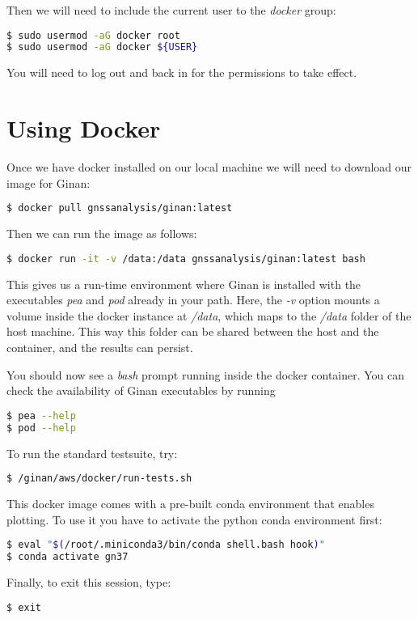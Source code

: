 Then we will need to include the current user to the \emph{docker} group:
\begin{lstlisting}[language=bash]
$ sudo usermod -aG docker root
$ sudo usermod -aG docker ${USER}
\end{lstlisting}
You will need to log out and back in for the permissions to take effect.

\section{Using Docker}

Once we have docker installed on our local machine we will need to download our image for Ginan:
\begin{lstlisting}[language=bash]
$ docker pull gnssanalysis/ginan:latest
\end{lstlisting}
Then we can run the image as follows:
\begin{lstlisting}[language=bash]
$ docker run -it -v /data:/data gnssanalysis/ginan:latest bash
\end{lstlisting}
This gives us a run-time environment where Ginan is installed with the executables
\emph{pea} and \emph{pod} already in your path.
Here, the \emph{-v} option mounts a volume inside the docker instance at \emph{/data},
which maps to the \emph{/data} folder of the host machine. This way this folder
can be shared between the host and the container, and the results can persist.

You should now see a \emph{bash} prompt running inside the docker container.
You can check the availability of Ginan executables by running
\begin{lstlisting}[language=bash]
$ pea --help
$ pod --help
\end{lstlisting}

To run the standard testsuite, try:
\begin{lstlisting}[language=bash]
$ /ginan/aws/docker/run-tests.sh
\end{lstlisting}

This docker image comes with a pre-built conda environment that enables plotting. To use it
you have to activate the python conda environment first:
\begin{lstlisting}[language=bash]
$ eval "$(/root/.miniconda3/bin/conda shell.bash hook)"
$ conda activate gn37
\end{lstlisting}
Finally, to exit this session, type:
\begin{lstlisting}[language=bash]
$ exit
\end{lstlisting}


